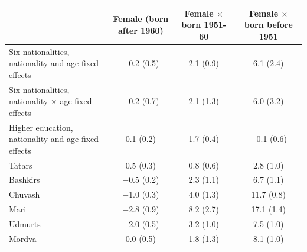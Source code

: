 \begin{tabular}{lccc}
\toprule
 & Female (born after 1960) & Female $\times$ born 1951-60 & Female $\times$ born before 1951 \\
\midrule
Six nationalities, nationality and age fixed effects & $-$0.2 (0.5) & 2.1 (0.9) & 6.1 (2.4) \\
Six nationalities, nationality $\times$ age fixed effects & $-$0.2 (0.7) & 2.1 (1.3) & 6.0 (3.2) \\
Higher education, nationality and age fixed effects & 0.1 (0.2) & 1.7 (0.4) & $-$0.1 (0.6) \\
\midrule
Tatars & 0.5 (0.3) & 0.8 (0.6) & 2.8 (1.0) \\
Bashkirs & $-$0.5 (0.2) & 2.3 (1.1) & 6.7 (1.1) \\
Chuvash & $-$1.0 (0.3) & 4.0 (1.3) & 11.7 (0.8) \\
Mari & $-$2.8 (0.9) & 8.2 (2.7) & 17.1 (1.4) \\
Udmurts & $-$2.0 (0.5) & 3.2 (1.0) & 7.5 (1.0) \\
Mordva & 0.0 (0.5) & 1.8 (1.3) & 8.1 (1.0) \\
\bottomrule
\end{tabular}
